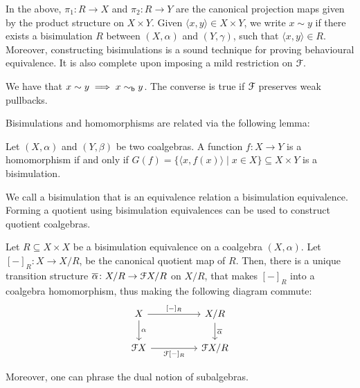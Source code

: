 In the above, $\pi_1 \colon R \to X$ and $\pi_2 \colon R \to Y$ are the canonical projection maps given by the product structure on $X\times Y$. Given $\langle x,y \rangle \in X \times Y$, we write $x \sim y$ if there exists a bisimulation $R$ between $(X, \alpha)$ and $(Y, \gamma)$, such that $\langle x,y \rangle \in R$. Moreover, constructing bisimulations is a sound technique for proving behavioural equivalence. It is also complete upon imposing a mild restriction on $\mathcal{F}$.
\begin{lemma}\label{c2:lem:behavioural_equivalence}
We have that
$
x \sim y \implies x \sim_{\mathsf{b}} y
$. The converse is true if $\mathcal{F}$ preserves weak pullbacks.	
\end{lemma}
Bisimulations and homomorphisms are related via the following lemma:
\begin{lemma}\label{c2:lem:functional_bisimulation}
	Let $(X, \alpha)$ and $(Y, \beta)$ be two coalgebras. A function $f \colon X \to Y$ is a homomorphism if and only if $G(f) = \{\langle x, f(x) \rangle \mid x \in X\} \subseteq X \times Y$ is a bisimulation.
\end{lemma}
We call a bisimulation that is an equivalence relation a bisimulation equivalence. Forming a quotient using bisimulation equivalences can be used to construct quotient coalgebras.
\begin{lemma}\label{c2:lem:quotient_coalgebra}
	Let $R \subseteq {X \times X}$ be a bisimulation equivalence on a coalgebra $(X, \alpha)$. Let $[-]_{R} \colon X \to {X}/{R}$, be the canonical quotient map of $R$. Then, there is a unique transition structure $\overline{\alpha} \colon {X}/{R} \to \mathcal{F} {X}/{R}$ on ${X}/{R}$, that makes $[-]_R$ into a coalgebra homomorphism, thus making the following diagram commute:
\[\begin{tikzcd}
	X && {{X}/{R}} \\
	{\funF X} && {\funF {X}/{R}}
	\arrow["{[-]_R}", from=1-1, to=1-3]
	\arrow["\alpha", from=1-1, to=2-1]
	\arrow["{\overline\alpha}", from=1-3, to=2-3]
	\arrow["{\funF [-]_R}"', from=2-1, to=2-3]
\end{tikzcd}\]
\end{lemma}
Moreover, one can phrase the dual notion of subalgebras.
